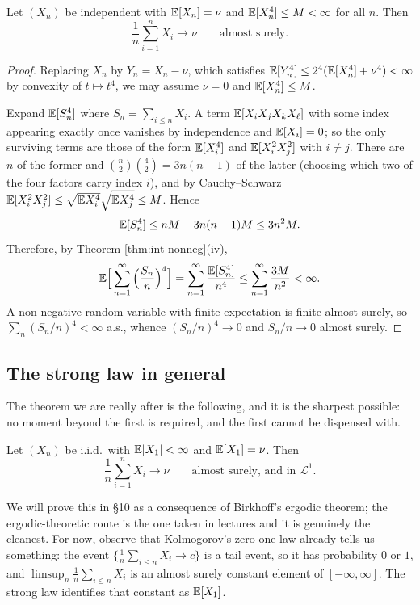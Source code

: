 \documentclass[a4paper]{scrartcl}
\newcommand{\cL}{\mathcal{L}}
\begin{document}
\begin{theorem}\label{thm:slln4}
	Let $(X_n)$ be independent with $\mathbb{E}[X_n]=\nu$ and $\mathbb{E}[X_n^4]\leq M<\infty$ for all $n$. Then
	$$
	\frac{1}{n}\sum_{i=1}^n X_i \longrightarrow \nu \qquad \text{almost surely.}
	$$
\end{theorem}
\begin{proof}
	Replacing $X_n$ by $Y_n = X_n - \nu$, which satisfies $\mathbb{E}[Y_n^4]\leq 2^4(\mathbb{E}[X_n^4]+\nu^4)<\infty$ by convexity of $t \mapsto t^4$, we may assume $\nu=0$ and $\mathbb{E}[X_n^4] \leq M$.

	Expand $\mathbb{E}[S_n^4]$ where $S_n = \sum_{i\leq n}X_i$. A term $\mathbb{E}[X_iX_jX_kX_\ell]$ with some index appearing exactly once vanishes by independence and $\mathbb{E}[X_i]=0$; so the only surviving terms are those of the form $\mathbb{E}[X_i^4]$ and $\mathbb{E}[X_i^2X_j^2]$ with $i \neq j$. There are $n$ of the former and $\binom{n}{2}\binom{4}{2} = 3n(n-1)$ of the latter (choosing which two of the four factors carry index $i$), and by Cauchy--Schwarz $\mathbb{E}[X_i^2X_j^2]\leq \sqrt{\mathbb{E} X_i^4}\sqrt{\mathbb{E} X_j^4}\leq M$. Hence
	$$
	\mathbb{E}[S_n^4] \leq nM + 3n(n-1)M \leq 3n^2 M.
	$$
	Therefore, by Theorem \ref{thm:int-nonneg}(iv),
	$$
	\mathbb{E}\Big[\sum_{n=1}^\infty \Big(\frac{S_n}{n}\Big)^4\Big] = \sum_{n=1}^\infty \frac{\mathbb{E}[S_n^4]}{n^4} \leq \sum_{n=1}^\infty \frac{3M}{n^2}<\infty.
	$$
	A non-negative random variable with finite expectation is finite almost surely, so $\sum_n (S_n/n)^4 < \infty$ a.s., whence $(S_n/n)^4 \to 0$ and $S_n/n \to 0$ almost surely.
\end{proof}

\subsection{The strong law in general}

The theorem we are really after is the following, and it is the sharpest possible: no moment beyond the first is required, and the first cannot be dispensed with.

\begin{theorem}\label{thm:slln}
	Let $(X_n)$ be i.i.d.\ with $\mathbb{E}|X_1|<\infty$ and $\mathbb{E}[X_1]=\nu$. Then
	$$
	\frac1n\sum_{i=1}^n X_i \longrightarrow \nu \qquad \text{almost surely, and in } \cL^1.
	$$
\end{theorem}

We will prove this in \S10 as a consequence of Birkhoff's ergodic theorem; the ergodic-theoretic route is the one taken in lectures and it is genuinely the cleanest. For now, observe that Kolmogorov's zero-one law already tells us something: the event $\{\frac1n\sum_{i\leq n}X_i \to c\}$ is a tail event, so it has probability $0$ or $1$, and $\limsup_n \frac1n\sum_{i\leq n}X_i$ is an almost surely constant element of $[-\infty,\infty]$. The strong law identifies that constant as $\mathbb{E}[X_1]$.
\end{document}

